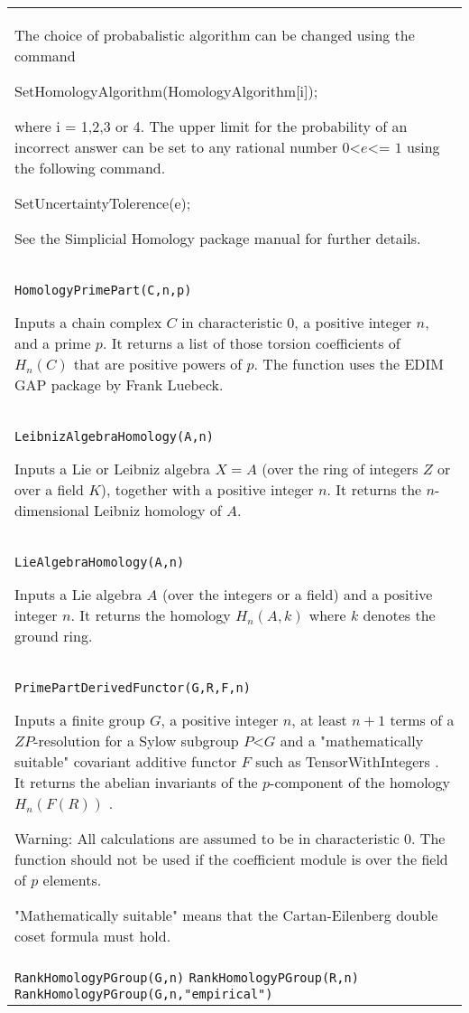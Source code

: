 \documentclass[a4paper,11pt]{report}
\begin{document}
{\begin{center}
\begin{tabular}{|l|}
 The choice of probabalistic algorithm can be changed using the command 

 SetHomologyAlgorithm(HomologyAlgorithm[i]);

 where i = 1,2,3 or 4. The upper limit for the probability of an incorrect
answer can be set to any rational number $0${\textless}$e${\textless}= $1$ using the following command. 

SetUncertaintyTolerence(e);

 See the Simplicial Homology package manual for further details. \\
 \index{HomologyPrimePart} \texttt{HomologyPrimePart(C,n,p)} 

 Inputs a chain complex $C$ in characteristic 0, a positive integer $n$, and a prime $p$. It returns a list of those torsion coefficients of $H_n(C)$ that are positive powers of $p$. The function uses the EDIM GAP package by Frank Luebeck. \\
 \index{LeibnizAlgebraHomology} \texttt{LeibnizAlgebraHomology(A,n)} 

 Inputs a Lie or Leibniz algebra $X=A$ (over the ring of integers $Z$ or over a field $K$), together with a positive integer $n$. It returns the $n$-dimensional Leibniz homology of $A$. \\
 \index{LieAlgebraHomology} \texttt{LieAlgebraHomology(A,n)} 

 Inputs a Lie algebra $A$ (over the integers or a field) and a positive integer $n$. It returns the homology $H_n(A,k)$ where $k$ denotes the ground ring. \\
 \index{PrimePartDerivedFunctor} \texttt{PrimePartDerivedFunctor(G,R,F,n)} 

 Inputs a finite group $G$, a positive integer $n$, at least $n+1$ terms of a $ZP$-resolution for a Sylow subgroup $P${\textless}$G$ and a "mathematically suitable" covariant additive functor $F$ such as TensorWithIntegers . It returns the abelian invariants of the $p$-component of the homology $H_n(F(R))$ . 

 Warning: All calculations are assumed to be in characteristic 0. The function
should not be used if the coefficient module is over the field of $p$ elements. 

 "Mathematically suitable" means that the Cartan-Eilenberg double coset formula
must hold. \\
 \index{RankHomologyPGroup} \texttt{RankHomologyPGroup(G,n)} {\nobreakspace} \texttt{RankHomologyPGroup(R,n)} {\nobreakspace} \texttt{RankHomologyPGroup(G,n,"empirical")} 


\end{tabular}
\end{center}}
\end{document}

